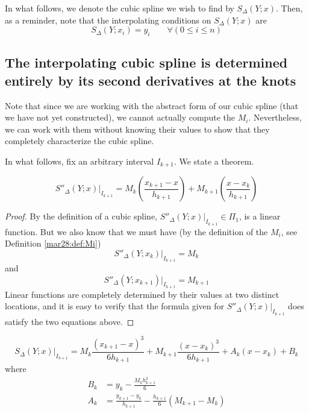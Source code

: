 In what follows, we denote the cubic spline we wish to find by $S_\Delta(Y ; x)$. Then, as a reminder, note that the interpolating conditions on $S_\Delta(Y ; x)$ are
\[
  S_\Delta(Y ; x_i) = y_i \qquad \forall(0 \leq i \leq n)
\]

\subsection{The interpolating cubic spline is determined entirely by its second derivatives at the knots}

Note that since we are working with the abstract form of our cubic spline (that we have not yet constructed), we cannot actually compute the $M_i$. Nevertheless, we can work with them without knowing their values to show that they completely characterize the cubic spline.

In what follows, fix an arbitrary interval $I_{k+1}$.  We state a theorem.
\begin{thm}
  \label{mar28:thm:dd_form}
  \[
    S''_\Delta(Y ; x) \vert_{I_{k+1}}
    =
    M_k\left(\frac{x_{k+1} - x}{h_{k+1}}\right)
    +
    M_{k+1}\left(\frac{x - x_k}{h_{k+1}}\right)
  \]
\end{thm}

\begin{proof}
  By the definition of a cubic spline, $S''_\Delta(Y ; x) \vert_{I_{k+1}} \in \Pi_1$, is a linear function. But we also know that we must have (by the definition of the $M_i$, see Definition \ref{mar28:def:Mi})
  \[
    S''_\Delta(Y ; x_k) \vert_{I_{k+1}} = M_k
  \]
  and
  \[
    S''_\Delta(Y ; x_{k+1}) \vert_{I_{k+1}} = M_{k+1}
  \]
  Linear functions are completely determined by their values at two distinct locations, and it is easy to verify that the formula given for $S''_\Delta(Y ; x) \vert_{I_{k+1}}$ does satisfy the two equations above.
  \hfill
\end{proof}

\begin{thm}
  \label{mar28:thm:M_determines}
  \[
    S_\Delta(Y ; x) \vert_{I_{k+1}}
    =
    M_k\frac{(x_{k+1} - x)^3}{6h_{k+1}}
    +
    M_{k+1}\frac{(x - x_k)^3}{6h_{k+1}}
    +
    A_k(x - x_k) + B_k
  \]
  where
  \begin{align*}
    B_k &= y_k - \frac{M_kh^2_{k+1}}{6} \\
    A_k &= \frac{y_{k+1} - y_k}{h_{k+1}} - \frac{h_{k+1}}{6}(M_{k+1} - M_k)
  \end{align*}
\end{thm}

